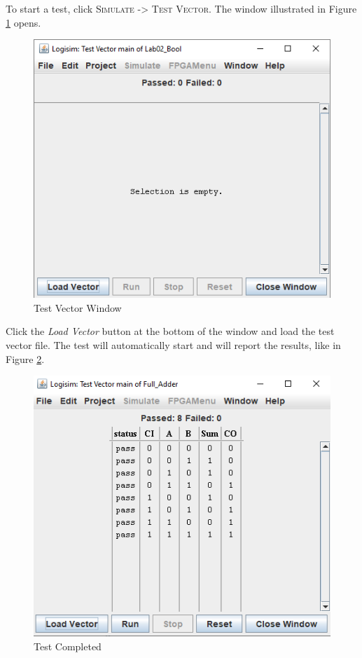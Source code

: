 To start a test, click \textsc{Simulate -> Test Vector}. The window illustrated in Figure \ref{fig:add-04} opens. 

\begin{figure}[H]
	\centering
	\includegraphics[width=\maxwidth{.95\linewidth}]{gfx/add-04}
	\caption{Test Vector Window}
	\label{fig:add-04}
\end{figure}

Click the \textit{Load Vector} button at the bottom of the window and load the test vector file. The test will automatically start and \LE will report the results, like in Figure \ref{fig:add-05}.

\begin{figure}[H]
	\centering
	\includegraphics[width=\maxwidth{.95\linewidth}]{gfx/add-05}
	\caption{Test Completed}
	\label{fig:add-05}
\end{figure}

